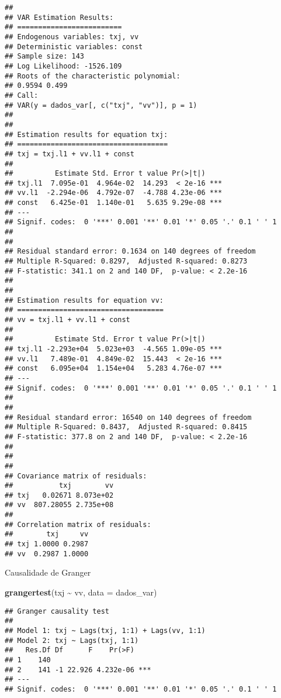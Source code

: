 \documentclass[
]{article}
\newenvironment{Shaded}{\begin{snugshade}}{\end{snugshade}}
\newcommand{\AttributeTok}[1]{\textcolor[rgb]{0.13,0.29,0.53}{#1}}
\newcommand{\FunctionTok}[1]{\textcolor[rgb]{0.13,0.29,0.53}{\textbf{#1}}}
\newcommand{\NormalTok}[1]{#1}
\newcommand{\SpecialCharTok}[1]{\textcolor[rgb]{0.81,0.36,0.00}{\textbf{#1}}}
\begin{document}
\begin{verbatim}
## 
## VAR Estimation Results:
## ========================= 
## Endogenous variables: txj, vv 
## Deterministic variables: const 
## Sample size: 143 
## Log Likelihood: -1526.109 
## Roots of the characteristic polynomial:
## 0.9594 0.499
## Call:
## VAR(y = dados_var[, c("txj", "vv")], p = 1)
## 
## 
## Estimation results for equation txj: 
## ==================================== 
## txj = txj.l1 + vv.l1 + const 
## 
##          Estimate Std. Error t value Pr(>|t|)    
## txj.l1  7.095e-01  4.964e-02  14.293  < 2e-16 ***
## vv.l1  -2.294e-06  4.792e-07  -4.788 4.23e-06 ***
## const   6.425e-01  1.140e-01   5.635 9.29e-08 ***
## ---
## Signif. codes:  0 '***' 0.001 '**' 0.01 '*' 0.05 '.' 0.1 ' ' 1
## 
## 
## Residual standard error: 0.1634 on 140 degrees of freedom
## Multiple R-Squared: 0.8297,  Adjusted R-squared: 0.8273 
## F-statistic: 341.1 on 2 and 140 DF,  p-value: < 2.2e-16 
## 
## 
## Estimation results for equation vv: 
## =================================== 
## vv = txj.l1 + vv.l1 + const 
## 
##          Estimate Std. Error t value Pr(>|t|)    
## txj.l1 -2.293e+04  5.023e+03  -4.565 1.09e-05 ***
## vv.l1   7.489e-01  4.849e-02  15.443  < 2e-16 ***
## const   6.095e+04  1.154e+04   5.283 4.76e-07 ***
## ---
## Signif. codes:  0 '***' 0.001 '**' 0.01 '*' 0.05 '.' 0.1 ' ' 1
## 
## 
## Residual standard error: 16540 on 140 degrees of freedom
## Multiple R-Squared: 0.8437,  Adjusted R-squared: 0.8415 
## F-statistic: 377.8 on 2 and 140 DF,  p-value: < 2.2e-16 
## 
## 
## 
## Covariance matrix of residuals:
##           txj        vv
## txj   0.02671 8.073e+02
## vv  807.28055 2.735e+08
## 
## Correlation matrix of residuals:
##        txj     vv
## txj 1.0000 0.2987
## vv  0.2987 1.0000
\end{verbatim}

Causalidade de Granger

\begin{Shaded}
\begin{Highlighting}[]
\FunctionTok{grangertest}\NormalTok{(txj }\SpecialCharTok{\textasciitilde{}}\NormalTok{ vv, }\AttributeTok{data =}\NormalTok{ dados\_var)}
\end{Highlighting}
\end{Shaded}

\begin{verbatim}
## Granger causality test
## 
## Model 1: txj ~ Lags(txj, 1:1) + Lags(vv, 1:1)
## Model 2: txj ~ Lags(txj, 1:1)
##   Res.Df Df      F    Pr(>F)    
## 1    140                        
## 2    141 -1 22.926 4.232e-06 ***
## ---
## Signif. codes:  0 '***' 0.001 '**' 0.01 '*' 0.05 '.' 0.1 ' ' 1
\end{verbatim}
\end{document}
